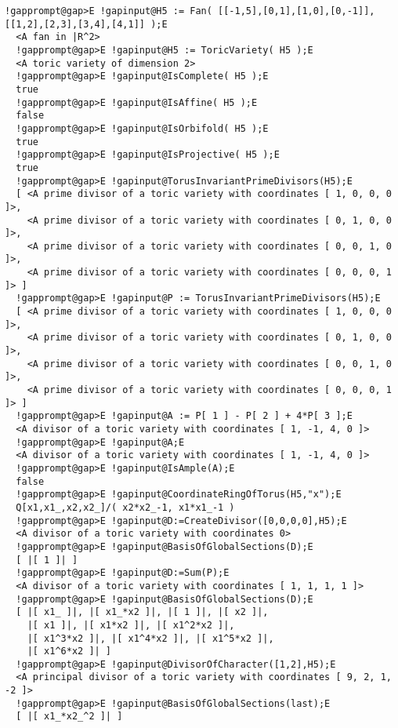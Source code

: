 \documentclass[a4paper,11pt]{report}
\begin{document}
{{{\begin{Verbatim}[commandchars=!@E,fontsize=\small,frame=single,label=Example]
  !gapprompt@gap>E !gapinput@H5 := Fan( [[-1,5],[0,1],[1,0],[0,-1]],[[1,2],[2,3],[3,4],[4,1]] );E
  <A fan in |R^2>
  !gapprompt@gap>E !gapinput@H5 := ToricVariety( H5 );E
  <A toric variety of dimension 2>
  !gapprompt@gap>E !gapinput@IsComplete( H5 );E
  true
  !gapprompt@gap>E !gapinput@IsAffine( H5 );E
  false
  !gapprompt@gap>E !gapinput@IsOrbifold( H5 );E
  true
  !gapprompt@gap>E !gapinput@IsProjective( H5 );E
  true
  !gapprompt@gap>E !gapinput@TorusInvariantPrimeDivisors(H5);E
  [ <A prime divisor of a toric variety with coordinates [ 1, 0, 0, 0 ]>,
    <A prime divisor of a toric variety with coordinates [ 0, 1, 0, 0 ]>, 
    <A prime divisor of a toric variety with coordinates [ 0, 0, 1, 0 ]>,
    <A prime divisor of a toric variety with coordinates [ 0, 0, 0, 1 ]> ]
  !gapprompt@gap>E !gapinput@P := TorusInvariantPrimeDivisors(H5);E
  [ <A prime divisor of a toric variety with coordinates [ 1, 0, 0, 0 ]>,
    <A prime divisor of a toric variety with coordinates [ 0, 1, 0, 0 ]>, 
    <A prime divisor of a toric variety with coordinates [ 0, 0, 1, 0 ]>, 
    <A prime divisor of a toric variety with coordinates [ 0, 0, 0, 1 ]> ]
  !gapprompt@gap>E !gapinput@A := P[ 1 ] - P[ 2 ] + 4*P[ 3 ];E
  <A divisor of a toric variety with coordinates [ 1, -1, 4, 0 ]>
  !gapprompt@gap>E !gapinput@A;E
  <A divisor of a toric variety with coordinates [ 1, -1, 4, 0 ]>
  !gapprompt@gap>E !gapinput@IsAmple(A);E
  false
  !gapprompt@gap>E !gapinput@CoordinateRingOfTorus(H5,"x");E
  Q[x1,x1_,x2,x2_]/( x2*x2_-1, x1*x1_-1 )
  !gapprompt@gap>E !gapinput@D:=CreateDivisor([0,0,0,0],H5);E
  <A divisor of a toric variety with coordinates 0>
  !gapprompt@gap>E !gapinput@BasisOfGlobalSections(D);E
  [ |[ 1 ]| ]
  !gapprompt@gap>E !gapinput@D:=Sum(P);E
  <A divisor of a toric variety with coordinates [ 1, 1, 1, 1 ]>
  !gapprompt@gap>E !gapinput@BasisOfGlobalSections(D);E
  [ |[ x1_ ]|, |[ x1_*x2 ]|, |[ 1 ]|, |[ x2 ]|,
    |[ x1 ]|, |[ x1*x2 ]|, |[ x1^2*x2 ]|, 
    |[ x1^3*x2 ]|, |[ x1^4*x2 ]|, |[ x1^5*x2 ]|, 
    |[ x1^6*x2 ]| ]
  !gapprompt@gap>E !gapinput@DivisorOfCharacter([1,2],H5);E
  <A principal divisor of a toric variety with coordinates [ 9, 2, 1, -2 ]>
  !gapprompt@gap>E !gapinput@BasisOfGlobalSections(last);E
  [ |[ x1_*x2_^2 ]| ]
\end{Verbatim}
}

 }

  }

   
\end{document}
